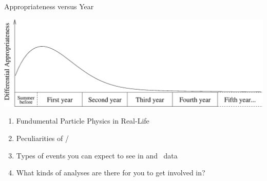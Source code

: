 \begin{slide*}
\slideframe{}
\begin{minipage}[t]{\linewidth}

\vspace{0.1 cm}
\huge
Appropriateness versus Year
\vspace{0.5 cm}

\includegraphics[width=\linewidth]{apropriateness.eps}

\end{minipage}

\vspace{1.3 cm}

\begin{minipage}[t]{\linewidth}

\vspace{0.1 cm}
\huge
\begin{enumerate}

  \item Fundumental Particle Physics in Real-Life

  \item Peculiarities of \cesr/\cleo

  \item Types of events you can expect to see in \mbox{\cleoiii} and \cleoc\ data

  \item What kinds of analyses are there for you to get involved in?

\end{enumerate}

\end{minipage}
\end{slide*}



